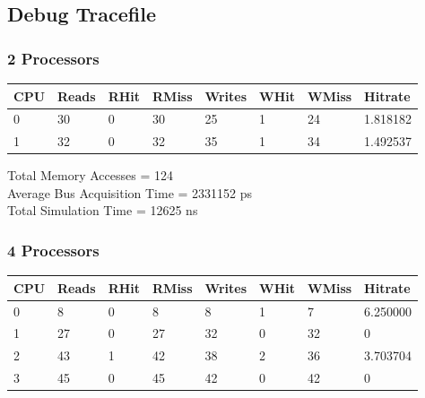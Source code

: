 \documentclass[]{article}
\begin{document}
\subsection{Debug Tracefile}

\subsubsection{2 Processors}

\begin{table}[H]
	\begin{tabular}{|l|l|l|l|l|l|l|l|}
		\hline
		\textbf{CPU} & \textbf{Reads} & \textbf{RHit} & \textbf{RMiss} & \textbf{Writes} & \textbf{WHit} & \textbf{WMiss} & \textbf{Hitrate} \\ \hline
		0            & 30             & 0             & 30             & 25              & 1             & 24             & 1.818182         \\ \hline
		1            & 32             & 0             & 32             & 35              & 1             & 34             & 1.492537         \\ \hline
	\end{tabular}
\end{table}

Total Memory Accesses = 124\\
Average Bus Acquisition Time = 2331152 ps\\
Total Simulation Time = 12625 ns\\

\subsubsection{4 Processors}

\begin{table}[H]
	\begin{tabular}{|l|l|l|l|l|l|l|l|}
		\hline
		\textbf{CPU} & \textbf{Reads} & \textbf{RHit} & \textbf{RMiss} & \textbf{Writes} & \textbf{WHit} & \textbf{WMiss} & \textbf{Hitrate} \\ \hline
		0            & 8              & 0             & 8              & 8               & 1             & 7              & 6.250000         \\ \hline
		1            & 27             & 0             & 27             & 32              & 0             & 32             & 0                \\ \hline
		2            & 43             & 1             & 42             & 38              & 2             & 36             & 3.703704         \\ \hline
		3            & 45             & 0             & 45             & 42              & 0             & 42             & 0                \\ \hline
	\end{tabular}
\end{table}
\end{document}
